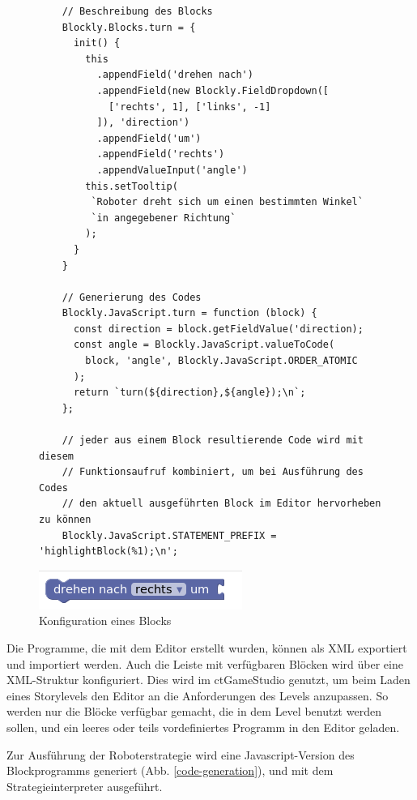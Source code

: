 \begin{figure}
  \caption{Konfiguration eines Blocks}

  \label{block-configuration}

  \begin{lstlisting}
    // Beschreibung des Blocks
    Blockly.Blocks.turn = {
      init() {
        this
          .appendField('drehen nach')
          .appendField(new Blockly.FieldDropdown([
            ['rechts', 1], ['links', -1]
          ]), 'direction')
          .appendField('um')
          .appendField('rechts')
          .appendValueInput('angle')
        this.setTooltip(
         `Roboter dreht sich um einen bestimmten Winkel`
         `in angegebener Richtung`
        );
      }
    }

    // Generierung des Codes
    Blockly.JavaScript.turn = function (block) {
      const direction = block.getFieldValue('direction);
      const angle = Blockly.JavaScript.valueToCode(
        block, 'angle', Blockly.JavaScript.ORDER_ATOMIC
      );
      return `turn(${direction},${angle});\n`;
    };

    // jeder aus einem Block resultierende Code wird mit diesem
    // Funktionsaufruf kombiniert, um bei Ausführung des Codes
    // den aktuell ausgeführten Block im Editor hervorheben zu können
    Blockly.JavaScript.STATEMENT_PREFIX = 'highlightBlock(%1);\n';
  \end{lstlisting}

  \includegraphics{figures/blockly_configuration_turn.png}
\end{figure}

Die Programme, die mit dem Editor erstellt wurden, können als XML exportiert und importiert werden.
Auch die Leiste mit verfügbaren Blöcken wird über eine XML-Struktur konfiguriert. Dies wird im
ctGameStudio genutzt, um beim Laden eines Storylevels den Editor an die Anforderungen des Levels
anzupassen. So werden nur die Blöcke verfügbar gemacht, die in dem Level benutzt werden sollen, und
ein leeres oder teils vordefiniertes Programm in den Editor geladen.

Zur Ausführung der Roboterstrategie wird eine Javascript-Version des Blockprogramms generiert (Abb.
\ref{code-generation}), und mit dem Strategieinterpreter ausgeführt.

